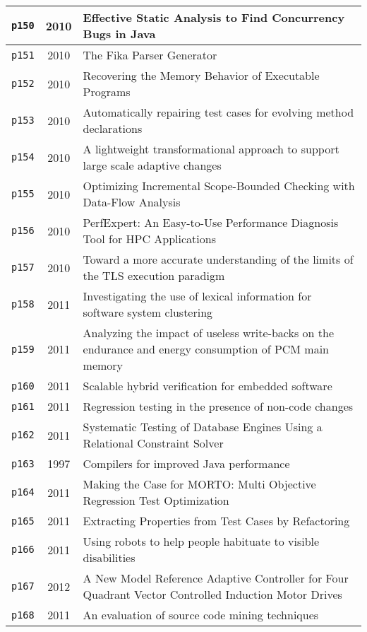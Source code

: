 \begin{longtable}{| c | c | p{16cm} |}
  \hline
  \texttt{p150} & 2010 & Effective Static Analysis to Find Concurrency Bugs in Java \\
  \hline
  \texttt{p151} & 2010 & The Fika Parser Generator \\
  \hline
  \texttt{p152} & 2010 & Recovering the Memory Behavior of Executable Programs \\
  \hline
  \texttt{p153} & 2010 & Automatically repairing test cases for evolving method declarations \\
  \hline
  \texttt{p154} & 2010 & A lightweight transformational approach to support large scale adaptive changes \\
  \hline
  \texttt{p155} & 2010 & Optimizing Incremental Scope-Bounded Checking with Data-Flow Analysis \\
  \hline
  \texttt{p156} & 2010 & PerfExpert: An Easy-to-Use Performance Diagnosis Tool for HPC Applications \\
  \hline
  \texttt{p157} & 2010 & Toward a more accurate understanding of the limits of the TLS execution paradigm \\
  \hline
  \texttt{p158} & 2011 & Investigating the use of lexical information for software system clustering \\
  \hline
  \texttt{p159} & 2011 & Analyzing the impact of useless write-backs on the endurance and energy consumption of PCM main memory \\
  \hline
  \texttt{p160} & 2011 & Scalable hybrid verification for embedded software \\
  \hline
  \texttt{p161} & 2011 & Regression testing in the presence of non-code changes \\
  \hline
  \texttt{p162} & 2011 & Systematic Testing of Database Engines Using a Relational Constraint Solver \\
  \hline
  \texttt{p163} & 1997 & Compilers for improved Java performance \\
  \hline
  \texttt{p164} & 2011 & Making the Case for MORTO: Multi Objective Regression Test Optimization \\
  \hline
  \texttt{p165} & 2011 & Extracting Properties from Test Cases by Refactoring \\
  \hline
  \texttt{p166} & 2011 & Using robots to help people habituate to visible disabilities \\
  \hline
  \texttt{p167} & 2012 & A New Model Reference Adaptive Controller for Four Quadrant Vector Controlled Induction Motor Drives \\
  \hline
  \texttt{p168} & 2011 & An evaluation of source code mining techniques \\

\end{longtable}
